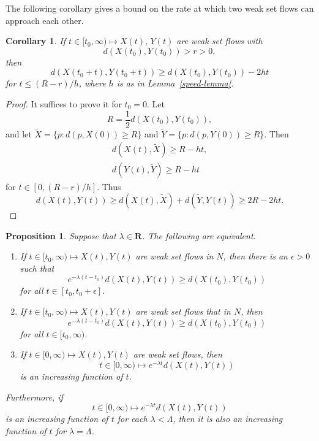 \documentclass{amsart}
\newcommand{\RR}{\mathbf{R}}  %
\newcommand{\eps}{\epsilon}
\newtheorem{corollary}  [theorem]     {Corollary}
\newtheorem{proposition}       [theorem]       {Proposition}
\theoremstyle{definition}
\theoremstyle{definition}
\begin{document}
The following corollary gives a bound on the rate at which two
weak set flows can approach each other.

\begin{corollary}\label{double-speed-corollary}
If $t\in [t_0,\infty)\mapsto X(t), \, Y(t)$ are weak set flows with
\[
   d(X(t_0),Y(t_0))  > r > 0,
\]
then
\[
    d(X(t_0+t),Y(t_0+t)) \ge d(X(t_0), Y(t_0))  - 2 h t
\]
for $t\le (R-r)/h$, where $h$ is as in Lemma~\ref{speed-lemma}.
\end{corollary}

\begin{proof}
It suffices to prove it for $t_0=0$.  Let
\[
   R = \frac12 d(X(t_0), Y(t_0)),
\]
and let $\tilde X = \{p: d(p,X(0))\ge R\}$ and $\tilde Y= \{p:d(p,Y(0)) \ge R\}$.
Then
\begin{gather*}
   d(X(t),\tilde X) \ge R - ht, \\
   d(Y(t), \tilde Y) \ge R - ht
\end{gather*}
for $t\in [0,(R-r)/h]$.  Thus
\[
d(X(t),Y(t)) \ge d(X(t),\tilde X) + d(\tilde Y,Y(t)) \ge 2R - 2ht.
\]
\end{proof}
 


\begin{proposition}\label{equivalence-proposition}
Suppose that $\lambda\in \RR$.
The following are equivalent.
\begin{enumerate}[\upshape (1)]
\item\label{equiv-1} If $t\in [t_0,\infty)\mapsto X(t),Y(t)$ are weak set flows in $N$,
then there is an $\eps>0$ such that 
\begin{equation*}
   e^{-\lambda (t-t_0)} d(X(t),Y(t)) \ge d(X(t_0), Y(t_0))
\end{equation*}
for all $t\in [t_0,t_0+\eps]$.
\item\label{equiv-2} If $t\in [t_0,\infty)\mapsto X(t),Y(t)$ are weak set flows that in $N$, then
\[
   e^{-\lambda (t-t_0)} d(X(t),Y(t)) \ge d(X(t_0),Y(t_0))
\]
for all $t\in [t_0,\infty)$.
\item\label{equiv-3} If $t\in [0,\infty)\mapsto X(t),Y(t)$ are weak set flows, then 
\[
   t\in [0,\infty)\mapsto e^{-\lambda t} d(X(t),Y(t))
\]
is an increasing function of $t$.
\end{enumerate}
Furthermore, if 
\[
   t\in [0,\infty) \mapsto e^{-\lambda t} d(X(t),Y(t))
\]
is an increasing function of $t$ for each $\lambda<\Lambda$, then it is also
an increasing function of $t$ for $\lambda=\Lambda$.
\end{proposition}
\end{document}
